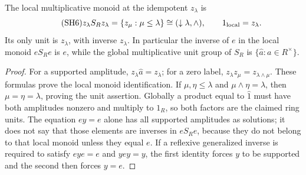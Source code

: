 \begin{proposition}\label{sh:localmult}
The local multiplicative monoid at the idempotent $z_\lambda$ is
\begin{equation}\tag{SH6}\label{sh:localmonoid}
 z_\lambda S_Rz_\lambda
 =\{z_\mu:\mu\le\lambda\}\cong(\downarrow\lambda,\wedge),
 \qquad 1_{\rm local}=z_\lambda .
\end{equation}
Its only unit is $z_\lambda$, with inverse $z_\lambda$.
In particular the inverse of $e$ in the local monoid $eS_Re$
is $e$, while the global multiplicative unit group of $S_R$
is $\{\widehat a:a\in R^\times\}$.
\end{proposition}
\begin{proof}
For a supported amplitude, $z_\lambda\widehat a=z_\lambda$;
for a zero label, $z_\lambda z_\mu=z_{\lambda\wedge\mu}$.
These formulas prove the local monoid identification.  If
$\mu,\eta\le\lambda$ and $\mu\wedge\eta=\lambda$, then
$\mu=\eta=\lambda$, proving the unit assertion. Globally a product
equal to $\widehat1$ must have both amplitudes nonzero and multiply
to $1_R$, so both factors are the claimed ring units.
The equation $ey=e$ alone has all supported amplitudes as solutions;
it does not say that those elements are inverses in $eS_Re$,
because they do not belong to that local monoid unless they equal
$e$. If a reflexive generalized inverse is required to satisfy
$eye=e$ and $yey=y$, the first identity forces $y$ to be supported
and the second then forces $y=e$.
\end{proof}

